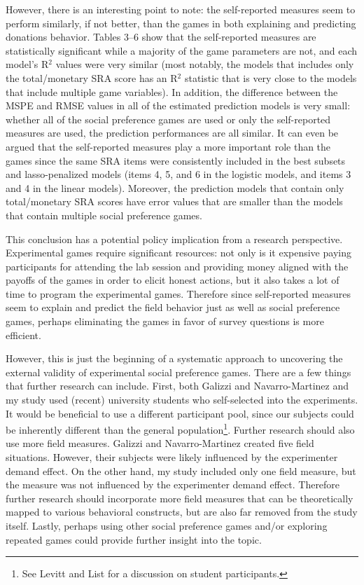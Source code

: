 \documentclass[12pt]{article}
\begin{document}
However, there is an interesting point to note: the self-reported measures seem to perform similarly, if not better, than the games in both explaining and predicting donations behavior. Tables 3--6 show that the self-reported measures are statistically significant while a majority of the game parameters are not, and each model\rq s R$^{2}$ values were very similar (most notably, the models that includes only the total/monetary SRA score has an R$^{2}$ statistic that is very close to the models that include multiple game variables). In addition, the difference between the MSPE and RMSE values in all of the estimated prediction models is very small: whether all of the social preference games are used or only the self-reported measures are used, the prediction performances are all similar. It can even be argued that the self-reported measures play a more important role than the games since the same SRA items were consistently included in the best subsets and lasso-penalized models (items 4, 5, and 6 in the logistic models, and items 3 and 4 in the linear models). Moreover, the prediction models that contain only total/monetary SRA scores have error values that are smaller than the models that contain multiple social preference games.

This conclusion has a potential policy implication from a research perspective. Experimental games require significant resources: not only is it expensive paying participants for attending the lab session and providing money aligned with the payoffs of the games in order to elicit honest actions, but it also takes a lot of time to program the experimental games. Therefore since self-reported measures seem to explain and predict the field behavior just as well as social preference games, perhaps eliminating the games in favor of survey questions is more efficient.

However, this is just the beginning of a systematic approach to uncovering the external validity of experimental social preference games. There are a few things that further research can include. First, both Galizzi and Navarro-Martinez and my study used (recent) university students who self-selected into the experiments. It would be beneficial to use a different participant pool, since our subjects could be inherently different than the general population\footnote{See Levitt and List for a discussion on student participants.}. Further research should also use more field measures. Galizzi and Navarro-Martinez created five field situations. However, their subjects were likely influenced by the experimenter demand effect. On the other hand, my study included only one field measure, but the measure was not influenced by the experimenter demand effect. Therefore further research should incorporate more field measures that can be theoretically mapped to various behavioral constructs, but are also far removed from the study itself. Lastly, perhaps using other social preference games and/or exploring repeated games could provide further insight into the topic.
\end{document}
